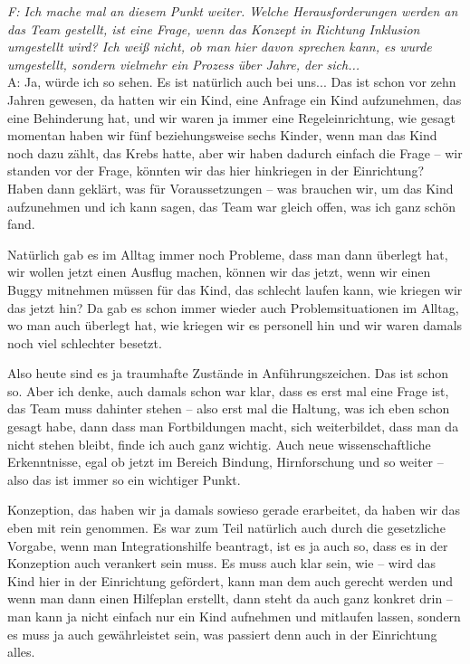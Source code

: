 \begin{linenumbers*}
\emph{F: Ich mache mal an diesem Punkt weiter. Welche Herausforderungen werden an das Team gestellt, ist eine Frage, wenn das Konzept in Richtung Inklusion umgestellt wird? Ich weiß nicht, ob man hier davon sprechen kann, es wurde umgestellt, sondern vielmehr ein Prozess über Jahre, der sich...}\\
A: Ja, würde ich so sehen. Es ist natürlich auch bei uns... Das ist schon vor zehn Jahren gewesen, da hatten wir ein Kind, eine Anfrage ein Kind aufzunehmen, das eine Behinderung hat, und wir waren ja immer eine Regeleinrichtung, wie gesagt momentan haben wir fünf beziehungsweise sechs Kinder, wenn man das Kind noch dazu zählt, das Krebs hatte, aber wir haben dadurch einfach die Frage -- wir standen vor der Frage, könnten wir das hier hinkriegen in der Einrichtung? 
Haben dann geklärt, was für Voraussetzungen -- was brauchen wir, um das Kind aufzunehmen und ich kann sagen, das Team war gleich offen, was ich ganz schön fand. 

Natürlich gab es im Alltag immer noch Probleme, dass man dann überlegt hat, wir wollen jetzt einen Ausflug machen, können wir das jetzt, wenn wir einen Buggy mitnehmen müssen für das Kind, das schlecht laufen kann, wie kriegen wir das jetzt hin? Da gab es schon immer wieder auch Problemsituationen im Alltag, wo man auch überlegt hat, wie kriegen wir es personell hin und wir waren damals noch viel schlechter besetzt. 

Also heute sind es ja traumhafte Zustände in Anführungszeichen. Das ist schon so. Aber ich denke, auch damals schon war klar, dass es erst mal eine Frage ist, das Team muss dahinter stehen -- also erst mal die Haltung, was ich eben schon gesagt habe, 
dann dass man Fortbildungen macht, sich weiterbildet, dass man da nicht stehen bleibt, finde ich auch ganz wichtig. Auch neue wissenschaftliche Erkenntnisse, egal ob jetzt im Bereich Bindung, Hirnforschung und so weiter -- also das ist immer so ein wichtiger Punkt.  

Konzeption, das haben wir ja damals sowieso gerade erarbeitet, da haben wir das eben mit rein genommen. Es war zum Teil natürlich auch durch die gesetzliche Vorgabe, wenn man Integrationshilfe beantragt, ist es ja auch so, dass es in der Konzeption auch verankert sein muss. Es muss auch klar sein, wie -- wird das Kind hier in der Einrichtung gefördert, kann man dem auch gerecht werden und wenn man dann einen Hilfeplan erstellt, dann steht da auch ganz konkret drin --  man kann ja nicht einfach nur ein Kind aufnehmen und mitlaufen lassen, sondern es muss ja auch gewährleistet sein, was passiert denn auch in der Einrichtung alles.


\end{linenumbers*}
